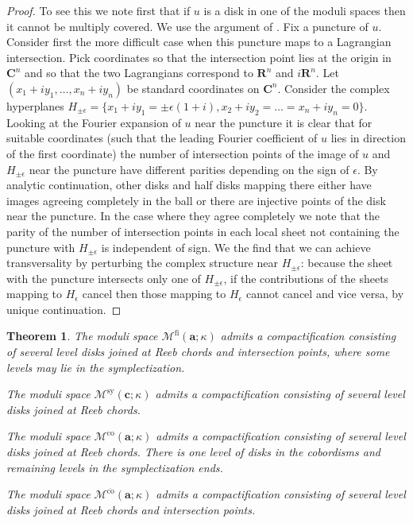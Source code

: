 \documentclass{gtpart}
\newtheorem{thm}{Theorem}
\renewcommand{\R}{\mathbf{R}}
\newcommand{\Cc}{\mathbf{C}}
\renewcommand{\co}{\mathrm{co}}
\newcommand{\fl}{\mathrm{fi}}
\newcommand{\sy}{\mathrm{sy}}
\begin{document}
\begin{proof} To see this we note first that if $u$ is a disk in one of the moduli spaces then it
    cannot be multiply covered. We use the argument of \cite{EESPxR}. Fix a puncture of $u$.
    Consider first the more difficult case when this puncture maps to a Lagrangian intersection.
    Pick coordinates so that the intersection point lies at the origin in $\Cc^{n}$ and so that the
    two Lagrangians correspond to $\R^{n}$ and $i\R^{n}$. Let $(x_{1}+iy_{1},\dots,x_{n}+iy_{n})$ be
    standard coordinates on $\Cc^{n}$. Consider the complex hyperplanes
    $H_{\pm\epsilon}=\{x_{1}+iy_{1}=\pm\epsilon(1+i),x_{2}+iy_{2}=\dots=x_{n}+iy_{n}=0\}$. Looking
    at the Fourier expansion of $u$ near the puncture it is clear that for suitable coordinates
    (such that the leading Fourier coefficient of $u$ lies in direction of the first coordinate) the
    number of intersection points of the image of $u$ and $H_{\pm\epsilon}$ near the puncture have
    different parities depending on the sign of $\epsilon$. By analytic continuation, other disks
    and half disks mapping there either have images agreeing completely in the ball or there are
    injective points of the disk near the puncture. In the case where they agree completely we note
    that the parity of the number of intersection points in each local sheet not containing the
    puncture with $H_{\pm\epsilon}$ is independent of sign. We the find that we can achieve
    transversality by perturbing the complex structure near $H_{\pm\epsilon}$: because the sheet
    with the puncture intersects only one of $H_{\pm\epsilon}$, if the contributions of the sheets
    mapping to $H_{\epsilon}$ cancel then those mapping to $H_{\epsilon}$ cannot cancel and vice
    versa, by unique continuation.  \end{proof}

\begin{thm}\label{thm:mdlicmpct}
The moduli space $\mathcal{M}^{\fl}(\mathbf{a};\kappa)$ admits a compactification consisting of several level disks joined at Reeb chords and intersection points, where some levels may lie in the symplectization.

The moduli space $\mathcal{M}^{\sy}(\mathbf{c};\kappa)$ admits a compactification consisting of several level disks joined at Reeb chords. 

The moduli space $\mathcal{M}^{\co}(\mathbf{a};\kappa)$ admits a compactification consisting of several level disks joined at Reeb chords. There is one level of disks in the cobordisms and remaining levels in the symplectization ends.

The moduli space $\mathcal{M}^{\overline{\co}}(\mathbf{a};\kappa)$ admits a compactification consisting of several level disks joined at Reeb chords and intersection points. 

\end{thm}
\end{document}
